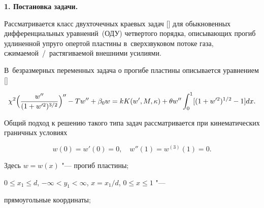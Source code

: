 


\date{03/IX/2013} %










\makerutitle



\textbf{1. Постановка задачи.}

Рассматривается класс двухточечных краевых задач [] для обыкновенных дифференциальных уравнений~(ОДУ) четвертого порядка, описывающих прогиб удлиненной упруго опертой пластины в~сверхзвуковом потоке газа, сжимаемой~/~растягиваемой внешними усилиями.



В~безразмерных переменных задача о прогибе пластины описывается уравнением []

\begin{equation}

\label{eqBad01}

  \chi^2\Bigl(\frac{w''}{(1+w'^{2})^{{3}/{2}}}\Bigr)''-Tw''+\beta_{0} w = kK(w',M,\kappa)+\theta

  w''\int_{0}^{1}[(1+w'^2)^{{1}/{2}}-1]dx.

\end{equation}



Общий подход к решению такого типа задач рассматривается при кинематических граничных условиях

\begin{equation}

\label{eqBad02} w(0)=w'(0)=0,\quad w''(1) = w^{(3)}(1)=0.

\end{equation}

Здесь $w=w(x)$ "--- прогиб пластины; 

$0\leq x_{1} \leq d$, $-\infty<y_{1}<\infty$, $x={x_{1}}/{d}$, $0\leq x\leq 1$ "---

прямоугольные координаты; 

